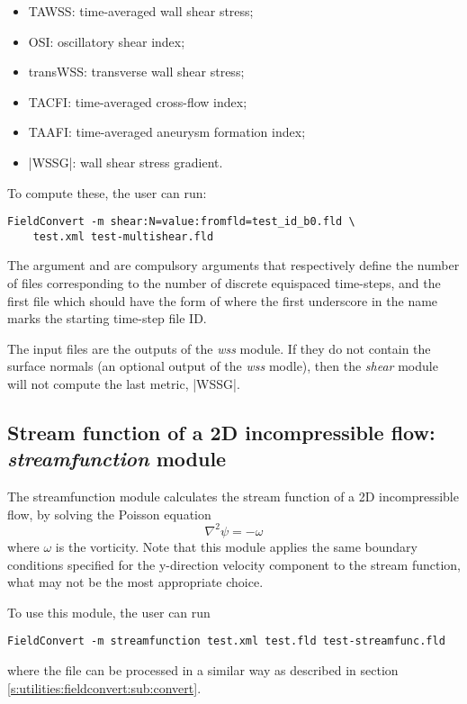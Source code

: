 \begin{itemize}
\item TAWSS: time-averaged wall shear stress;
\item OSI: oscillatory shear index;
\item transWSS: transverse wall shear stress;
\item TACFI: time-averaged cross-flow index;
\item TAAFI: time-averaged aneurysm formation index;
\item |WSSG|: wall shear stress gradient.
\end{itemize}

To compute these, the user can run:
\begin{lstlisting}[style=BashInputStyle]
FieldConvert -m shear:N=value:fromfld=test_id_b0.fld \
    test.xml test-multishear.fld
\end{lstlisting}
The argument  and  are compulsory arguments that respectively define the number of  files corresponding to the number of discrete equispaced time-steps, and the first  file which should have the form of  where the first underscore in the name marks the starting time-step file ID.

The input  files are the outputs of the \textit{wss} module. If they do not contain the surface normals (an optional output of the \textit{wss} modle), then the \textit{shear} module will not compute the last metric, |WSSG|.

%
%
%
\subsection{Stream function of a 2D incompressible flow: \textit{streamfunction} module}

The streamfunction module calculates the stream function of a 2D incompressible flow, by
solving the Poisson equation
\[
\nabla^2 \psi = -\omega
\]
where $\omega$ is the vorticity. Note that this module applies the same boundary conditions
specified for the y-direction velocity component \inltt{v} to the stream function,
what may not be the most appropriate choice.

To use this module, the user can run
\begin{lstlisting}[style=BashInputStyle]
FieldConvert -m streamfunction test.xml test.fld test-streamfunc.fld
\end{lstlisting}
where the file  can be processed in a similar
way as described in section \ref{s:utilities:fieldconvert:sub:convert}.


